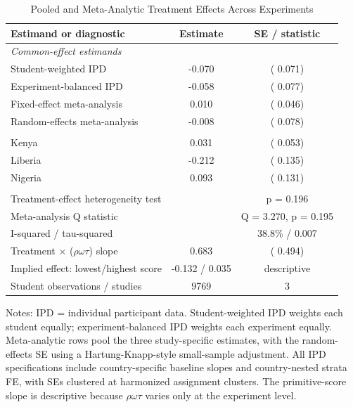 \begin{table}[H]
\centering
\caption{Pooled and Meta-Analytic Treatment Effects Across Experiments}
\label{tab:pooled_power}
\begin{threeparttable}
\footnotesize
\begin{tabular}[t]{lcc}
\toprule
Estimand or diagnostic & Estimate & SE / statistic \\
\midrule
\multicolumn{3}{l}{\textit{Common-effect estimands}} \\
Student-weighted IPD &  -0.070 & (  0.071) \\
Experiment-balanced IPD &  -0.058 & (  0.077) \\
Fixed-effect meta-analysis &   0.010 & (  0.046) \\
Random-effects meta-analysis &  -0.008 & (  0.078) \\
\addlinespace
\multicolumn{3}{l}{\textit{Study-specific effects from stacked IPD}} \\
Kenya &   0.031 & (  0.053) \\
Liberia &  -0.212 & (  0.135) \\
Nigeria &   0.093 & (  0.131) \\
\addlinespace
\multicolumn{3}{l}{\textit{Heterogeneity and primitive-score diagnostics}} \\
Treatment-effect heterogeneity test &  & p =   0.196 \\
Meta-analysis Q statistic &  & Q =   3.270, p =   0.195 \\
I-squared / tau-squared &  &    38.8\% /   0.007 \\
Treatment $\times$ ($\rho\omega\tau$) slope &   0.683 & (  0.494) \\
Implied effect: lowest/highest score &  -0.132 /   0.035 & descriptive \\
\addlinespace
Student observations / studies & 9769 & 3 \\
\bottomrule
\end{tabular}
\begin{tablenotes}
\footnotesize
\item Notes: IPD = individual participant data. Student-weighted IPD weights each student equally; experiment-balanced IPD weights each experiment equally. Meta-analytic rows pool the three study-specific estimates, with the random-effects SE using a Hartung-Knapp-style small-sample adjustment. All IPD specifications include country-specific baseline slopes and country-nested strata FE, with SEs clustered at harmonized assignment clusters. The primitive-score slope is descriptive because $\rho\omega\tau$ varies only at the experiment level.
\end{tablenotes}
\end{threeparttable}
\end{table}
